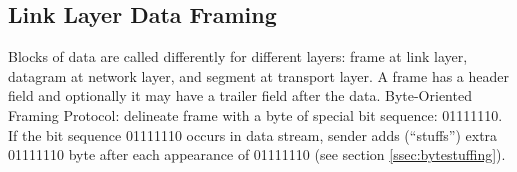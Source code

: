 \subsection{Link Layer Data Framing}
Blocks of data are called differently for different layers: frame at
link layer, datagram at network layer, and segment at transport layer. A
frame has a header field and optionally it may have a trailer field
after the data. Byte-Oriented Framing Protocol: delineate frame with a
byte of special bit sequence: 01111110. If the bit sequence 01111110
occurs in data stream, sender adds (“stuffs”) extra 01111110 byte after
each appearance of 01111110 (see section \ref{ssec:bytestuffing}).